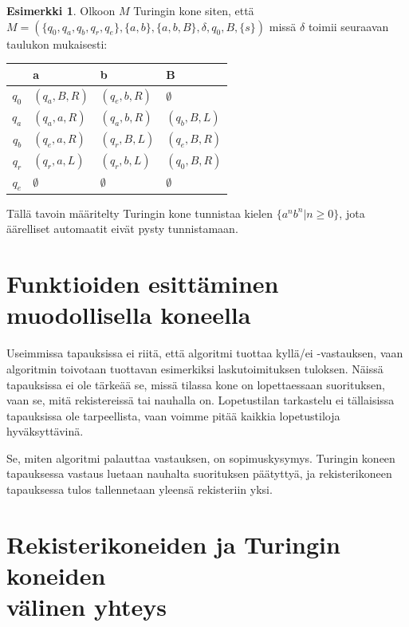 \documentclass[a4paper, 12pt]{article}
\theoremstyle{definition}
\newtheorem{example}[mydef]{Esimerkki}
\theoremstyle{plain}
\begin{document}
\begin{example}
Olkoon $M$ Turingin kone siten, että\\$M = (\{q_0, q_a, q_b, q_r, q_e\}, \{a, b\}, \{a, b, B\}, \delta, q_0, B, \{s\})$ missä $\delta$ toimii seuraavan taulukon mukaisesti:

\begin{tabular}{r | l l l}
& a & b & B \\
\hline
$q_0$ & $(q_a, B, R)$ & $(q_e, b, R)$ & $\emptyset$ \\
$q_a$ & $(q_a, a, R)$ & $(q_a, b, R)$ & $(q_b, B, L)$ \\
$q_b$ & $(q_e, a, R)$ & $(q_r, B, L)$ & $(q_e, B, R)$\\
$q_r$ & $(q_r, a, L)$ & $(q_r, b, L)$ & $(q_0, B, R)$\\
$q_e$ & $\emptyset$ & $\emptyset$ & $\emptyset$ \\ 
\end{tabular}

Tällä tavoin määritelty Turingin kone tunnistaa kielen $\{a^nb^n | n \geq 0\}$, jota äärelliset automaatit eivät pysty tunnistamaan.

\end{example}

\section{Funktioiden esittäminen muodollisella koneella}

Useimmissa tapauksissa ei riitä, että algoritmi tuottaa kyllä/ei -vastauksen, vaan algoritmin toivotaan tuottavan esimerkiksi laskutoimituksen tuloksen. Näissä tapauksissa ei ole tärkeää se, missä tilassa kone on lopettaessaan suorituksen, vaan se, mitä rekistereissä tai nauhalla on. Lopetustilan tarkastelu ei tällaisissa tapauksissa ole tarpeellista, vaan voimme pitää kaikkia lopetustiloja hyväksyttävinä.

Se, miten algoritmi palauttaa vastauksen, on sopimuskysymys. Turingin koneen tapauksessa vastaus luetaan nauhalta suorituksen päätyttyä, ja rekisterikoneen tapauksessa tulos tallennetaan yleensä rekisteriin yksi.

\section{Rekisterikoneiden ja Turingin koneiden\\ välinen yhteys}
\end{document}
